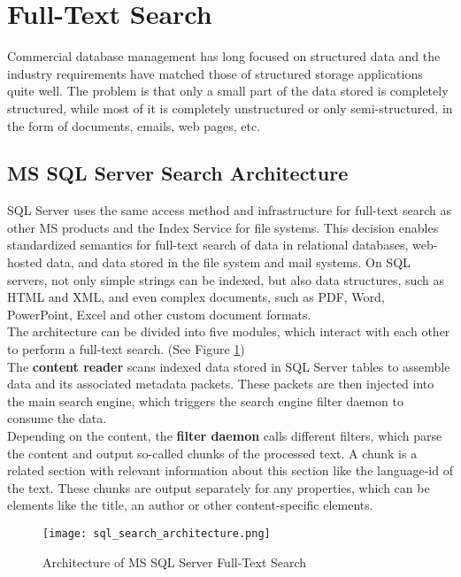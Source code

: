 \newpage
\section{Full-Text Search}
Commercial database management has long focused on structured data and the industry requirements have matched those of structured storage applications quite well.
The problem is that only a small part of the data stored is completely structured, while most of it is completely unstructured or only semi-structured, in the form of documents, emails, web pages, etc. \parencite[cf.][p. 7]{hamilton_microsoft_2001}\\
\subsection{MS SQL Server Search Architecture}
\ac{SQL} Server uses the same access method and infrastructure for full-text search as other \ac{MS} products and the Index Service for file systems. This decision enables standardized semantics for full-text search of data in relational databases, web-hosted data, and data stored in the file system and mail systems. On \ac{SQL} servers, not only simple strings can be indexed, but also data structures, such as \ac{HTML} and \ac{XML}, and even complex documents, such as \ac{PDF}, Word, PowerPoint, Excel and other custom document formats. \parencite[cf.][p. 7]{hamilton_microsoft_2001}\\
The architecture can be divided into five modules, which interact with each other to perform a full-text search. (See Figure \ref{fig:sql_search_architecture})\\
The \textbf{content reader} scans indexed data stored in \ac{SQL} Server tables to assemble data and its associated metadata packets. These packets are then injected into the main search engine, which triggers the search engine filter daemon to consume the data.\\
Depending on the content, the \textbf{filter daemon} calls different filters, which parse the content and output so-called chunks of the processed text. A chunk is a related section with relevant information about this section like the language-id of the text. These chunks are output separately for any properties, which can be elements like the title, an author or other content-specific elements.
\begin{figure}[H]
    \caption{Architecture of MS SQL Server Full-Text Search}
    \label{fig:sql_search_architecture}
    \texttt{[image: sql\_search\_architecture.png]}
    \\
    \cite[Source:][p. 8]{hamilton_microsoft_2001}
\end{figure}
